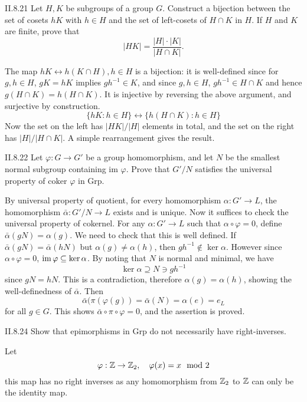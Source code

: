 \begin{problem}{II.8.21}
Let $H,K$ be subgroups of a group $G$. Construct a bijection between the set of cosets $hK$ with $h \in H$ and the set of left-cosets of $H \cap K$ in $H$. If $H$ and $K$ are finite, prove that 
\[
|HK| = \frac{|H| \cdot |K|}{|H \cap K|}.	
\]
\end{problem}
\begin{pf}
The map $hK \leftrightarrow h(K \cap H), h \in H$ is a bijection: it is well-defined since for $g, h \in H$, $gK = hK$ implies $gh^{-1} \in K$, and since $g,h \in H$, $gh^{-1} \in H \cap K$ and hence $g(H \cap K) = h(H \cap K).$ It is injective by reversing the above argument, and surjective by construction.
\[
\{hK:h \in H\} \longleftrightarrow \{h(H \cap K): h \in H\}	
\]
Now the set on the left has $|HK|/|H|$ elements in total, and the set on the right has $|H|/|H\cap K|$. A simple rearrangement gives the result.
\end{pf}

\begin{problem}{II.8.22}
Let $\varphi:G \to G'$ be a group homomorphism, and let $N$ be the smallest normal subgroup containing im $\varphi$. Prove that $G'/N$ satisfies the universal property of $\text{coker }\varphi$ in \textsf{Grp}.
\end{problem}
\begin{pf}
By universal property of quotient, for every homomorphism $\alpha : G' \to L$,  the homomorphism $\bar{\alpha} : G'/N \to L$ exists and is unique. Now it suffices to check the universal property of cokernel. For any $\alpha : G' \to L$ such that $\alpha \circ \varphi = 0$, define $\bar{\alpha}(gN) = \alpha(g)$. We need to check that this is well defined. If $\bar{\alpha}(gN) = \bar{\alpha}(hN)$ but $\alpha(g) \neq \alpha(h)$, then $gh^{-1} \notin \ker \alpha$. However since $\alpha \circ \varphi = 0$, $\operatorname{im} \varphi \subseteq \ker \alpha$. By noting that $N$ is normal and minimal, we have \[
\ker \alpha \supseteq N \ni gh^{-1}
\]
since $gN = hN$. This is a contradiction, therefore $\alpha(g) = \alpha(h)$, showing the well-definedness of $\bar{\alpha}$. Then
\[
\bar{\alpha}(\pi(\varphi(g)) = \bar{\alpha}(N) = \alpha(e) = e_L
\]
for all $g \in G$. This shows $\bar{\alpha} \circ \pi \circ \varphi = 0$, and the assertion is proved.
\end{pf}

\begin{problem}{II.8.24}
Show that epimorphisms in \textsf{Grp} do not necessarily have right-inverses.
\end{problem}
\begin{pf}
Let 
\[
\varphi : \mathbb{Z} \to \mathbb{Z}_2, \quad \varphi(x) = x\mod 2
\]
this map has no right inverses as any homomorphism from $\mathbb{Z}_2$ to $\mathbb{Z}$ can only be the identity map.
\end{pf}

